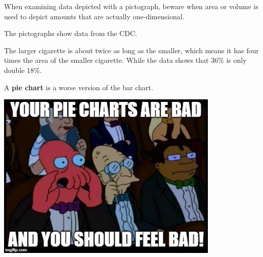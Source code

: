 \documentclass[handout]{beamer}
\begin{document}
\begin{frame}
\begin{note}
When examining data depicted with a pictograph, beware when area or volume is used to depict amounts that are actually one-dimensional.
\end{note}\pause

\begin{example}
The pictographs show data from the CDC\@.

\vspace{-7mm}
\begin{figure}
\centering
\hfill
{}
\hfill
{}
\hfill
\end{figure}
The larger cigarette is about twice as long as the smaller, which means it has four times the area of the smaller cigarette. While the data shows that 36\% is only double 18\%.
\end{example}
\end{frame}

\begin{frame}
\begin{definition}
A \textbf{pie chart} is a worse version of the bar chart.
\begin{center}
\includegraphics[width=0.8\textwidth]{zoidberg.jpg}
\end{center}
\end{definition}
\end{frame}
\end{document}
